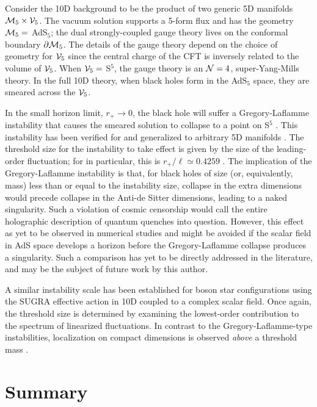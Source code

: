 \documentclass[../PhD.tex]{subfiles}
\begin{document}
Consider the 10D background to be the product of two generic 5D manifolds $\mathcal M_5 \times \mathcal V_5$. The vacuum solution supports a 5-form flux and has the geometry $\mathcal M_5 =$ AdS$_5$; the dual strongly-coupled gauge theory lives on the conformal boundary $\partial \mathcal M_5$. The details of the gauge theory depend on the choice of geometry for $\mathcal V_5$ since the central charge of the CFT is inversely related to the volume of $\mathcal V_5$. When $\mathcal V_5 =$ S$^5$, the gauge theory is an $\mathcal N = 4$, super-Yang-Mills theory. In the full 10D theory, when black holes form in the AdS$_5$ space, they are smeared across the $\mathcal V_5$. 

In the small horizon limit, $r_+ \to 0$, the black hole will suffer a Gregory-Laflamme instability that causes the smeared solution to collapse to a point on S$^5$ \cite{hep-th/9301052}. This instability has been verified for \ads and generalized to arbitrary 5D manifolds \cite{1509.07780}. The threshold size for the instability to take effect is given by the size of the leading-order fluctuation; for \ads in particular, this is $r_+ / \ell \simeq 0.4259$ \cite{1502.01574}. The implication of the Gregory-Laflamme instability is that, for black holes of size (or, equivalently, mass) less than or equal to the instability size, collapse in the extra dimensions would precede collapse in the Anti-de Sitter dimensions, leading to a naked singularity. Such a violation of cosmic censorship would call the entire holographic description of quantum quenches into question. However, this effect as yet to be observed in numerical studies and might be avoided if the scalar field in AdS space develops a horizon before the Gregory-Laflamme collapse produces a singularity. Such a comparison has yet to be directly addressed in the literature, and may be the subject of future work by this author.

A similar instability scale has been established for boson star configurations using the SUGRA effective action in 10D coupled to a complex scalar field. Once again, the threshold size is determined by examining the lowest-order contribution to the spectrum of linearized fluctuations. In contrast to the Gregory-Laflamme-type instabilities, localization on compact dimensions is observed \emph{above} a threshold mass \cite{1509.00774}.


\section{Summary}
\label{sec: summary}
\end{document}
